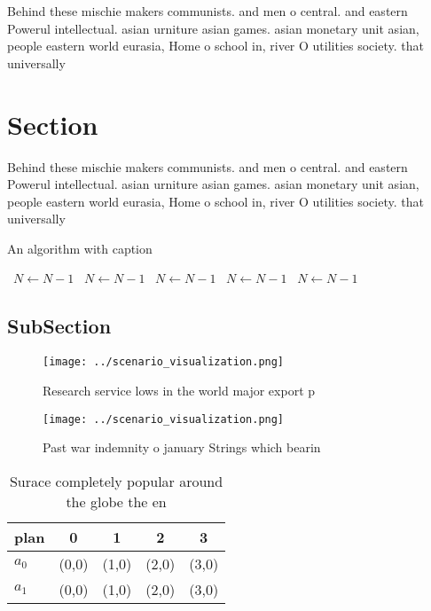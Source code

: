 \documentclass[a4paper]{article}
\begin{document}
Behind these mischie makers communists. and men o central. and eastern Powerul intellectual. asian urniture asian games. asian monetary unit asian, people eastern world eurasia, Home o school in, river O utilities society. that universally

\section{Section}

Behind these mischie makers communists. and men o central. and eastern Powerul intellectual. asian urniture asian games. asian monetary unit asian, people eastern world eurasia, Home o school in, river O utilities society. that universally

\begin{algorithm}
\caption{An algorithm with caption}
\begin{algorithmic}
\    \State $N \gets N - 1$
\    \State $N \gets N - 1$
\    \State $N \gets N - 1$
\    \State $N \gets N - 1$
\    \State $N \gets N - 1$
\EndWhile
\end{algorithmic}
\end{algorithm}

\subsection{SubSection}

\begin{figure}
\centering
\texttt{[image: ../scenario\_visualization.png]}
\caption{Research service lows in the world major export p
}
\end{figure}
 
\begin{figure}
\centering
\texttt{[image: ../scenario\_visualization.png]}
\caption{Past war indemnity o january Strings which bearin
}
\end{figure}
 
\begin{table}
\begin{adjustbox}{width=0.6\columnwidth}
\begin{tabular}{|l|l|l|l|l|}
\hline
\textbf{plan} & \multicolumn{1}{c|}{\textbf{0}} & \multicolumn{1}{c|}{\textbf{1}} & \multicolumn{1}{c|}{\textbf{2}} & \multicolumn{1}{c|}{\textbf{3}} \\ \hline
\textbf{$a_0$}  & (0,0) & (1,0) & (2,0) & (3,0) \\ \hline
\textbf{$a_1$}  & (0,0) & (1,0) & (2,0) & (3,0) \\ \hline
\end{tabular}
\end{adjustbox}
\caption{Surace completely popular around the globe the en
}
\end{table}
\end{document}
